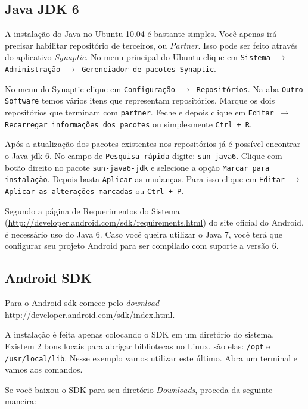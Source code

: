 \subsection{Java JDK 6}

A instalação do Java no Ubuntu 10.04 é bastante simples. Você apenas irá precisar habilitar repositório
de terceiros, ou \textit{Partner}. Isso pode ser feito através do aplicativo \textit{Synaptic}. No menu
principal do Ubuntu clique em \texttt{Sistema $\rightarrow$ Administração $\rightarrow$ Gerenciador de pacotes
Synaptic}.

No menu do Synaptic clique em \texttt{Configuração $\rightarrow$ Repositórios}. Na aba \texttt{Outro Software}
temos vários itens que representam repositórios. Marque os dois repositórios que terminam com \texttt{partner}.
Feche e depois clique em \texttt{Editar $\rightarrow$ Recarregar informações dos pacotes} ou simplesmente
\texttt{Ctrl + R}.

Após a atualização dos pacotes existentes nos repositórios já é possível encontrar o Java \gls{jdk} 6.
No campo de \texttt{Pesquisa rápida} digite: \texttt{sun-java6}. Clique com botão direito no pacote
\texttt{sun-java6-jdk} e selecione a opção \texttt{Marcar para instalação}. Depois basta \texttt{Aplicar}
as mudanças. Para isso clique em \texttt{Editar $\rightarrow$ Aplicar as alterações marcadas} ou \texttt{Ctrl + P}.

Segundo a página de Requerimentos do Sistema (\url{http://developer.android.com/sdk/requirements.html})
do site oficial do Android, é necessário uso do Java 6. Caso você queira utilizar o Java 7, você
terá que configurar seu projeto Android para ser compilado com suporte a versão 6.

\subsection{Android SDK \label{ssec:sdk}}

Para o Android \gls{sdk} comece pelo \textit{download} \url{http://developer.android.com/sdk/index.html}.

A instalação é feita apenas colocando o SDK em um diretório do sistema. Existem 2 bons locais para
abrigar bibliotecas no Linux, são elas: \texttt{/opt} e \texttt{/usr/local/lib}. Nesse exemplo vamos
utilizar este último. Abra um terminal e vamos aos comandos.

Se você baixou o SDK para seu diretório \textit{Downloads}, proceda da seguinte maneira:

\medskip

